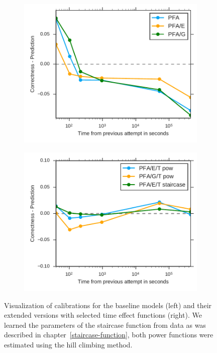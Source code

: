 \begin{figure}[htbp]
  \centering
  \begin{subfigure}{.49\textwidth}
    \centering
    \includegraphics[width=\textwidth]{img/calibration-time-effect-off}
    \caption{}
    \label{fig:calibration-time-effect-off}
  \end{subfigure}
  \begin{subfigure}{.49\textwidth}
    \centering
    \includegraphics[width=\textwidth]{img/calibration-time-effect-on}
    \caption{}
    \label{fig:calibration-time-effect-on}
  \end{subfigure}
  \caption{Visualization of calibrations for the baseline models (left) and their extended versions with selected time effect functions (right). We learned the parameters of the staircase function from data as was described in chapter~\ref{staircase-function}, both power functions were estimated using the hill climbing method.}
  \label{fig:calibration1}
\end{figure}

